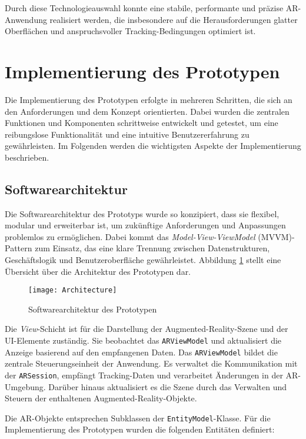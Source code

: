 Durch diese Technologieauswahl konnte eine stabile, performante und präzise AR-Anwendung realisiert werden, die insbesondere auf die Herausforderungen glatter Oberflächen und anspruchsvoller Tracking-Bedingungen optimiert ist.

\section{Implementierung des Prototypen}

Die Implementierung des Prototypen erfolgte in mehreren Schritten, die sich an den Anforderungen und dem Konzept orientierten. Dabei wurden die zentralen Funktionen und Komponenten schrittweise entwickelt und getestet, um eine reibungslose Funktionalität und eine intuitive Benutzererfahrung zu gewährleisten. Im Folgenden werden die wichtigsten Aspekte der Implementierung beschrieben.

\subsection{Softwarearchitektur}

Die Softwarearchitektur des Prototyps wurde so konzipiert, dass sie flexibel, modular und erweiterbar ist, um zukünftige Anforderungen und Anpassungen problemlos zu ermöglichen. Dabei kommt das \emph{Model-View-ViewModel} (MVVM)-Pattern zum Einsatz, das eine klare Trennung zwischen Datenstrukturen, Geschäftslogik und Benutzeroberfläche gewährleistet. Abbildung \ref{fig:Architecture} stellt eine Übersicht über die Architektur des Prototypen dar.

\begin{figure}[ht]
    \centering
    \texttt{[image: Architecture]}
    \caption{Softwarearchitektur des Prototypen}
    \label{fig:Architecture}
\end{figure}

Die \emph{View}-Schicht ist für die Darstellung der Augmented-Reality-Szene und der UI-Elemente zuständig. Sie beobachtet das \texttt{ARViewModel} und aktualisiert die Anzeige basierend auf den empfangenen Daten. Das \texttt{ARViewModel} bildet die zentrale Steuerungseinheit der Anwendung. Es verwaltet die Kommunikation mit der \texttt{ARSession}, empfängt Tracking-Daten und verarbeitet Änderungen in der AR-Umgebung. Darüber hinaus aktualisiert es die Szene durch das Verwalten und Steuern der enthaltenen Augmented-Reality-Objekte.

Die AR-Objekte entsprechen Subklassen der \texttt{EntityModel}-Klasse. Für die Implementierung des Prototypen wurden die folgenden Entitäten definiert:

